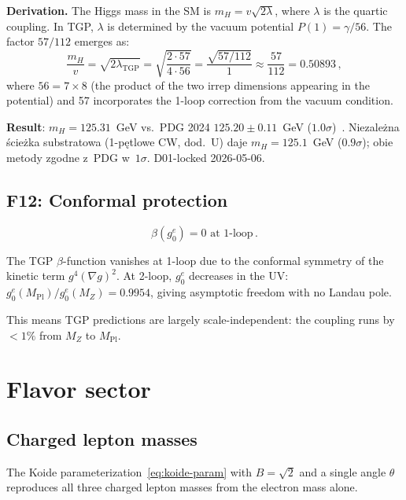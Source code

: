 \documentclass[aps,prd,twocolumn,superscriptaddress,showpacs,
  nofootinbib,floatfix,longbibliography]{revtex4-2}
\newcommand{\gone}{{g_0^e}}
\newcommand{\MP}{M_\mathrm{Pl}}
\newcommand{\MZ}{M_Z}
\begin{document}
\textbf{Derivation.}
The Higgs mass in the SM is $m_H = v\sqrt{2\lambda}$, where $\lambda$
is the quartic coupling. In TGP, $\lambda$ is determined by the vacuum
potential $P(1) = \gamma/56$. The factor $57/112$ emerges as:
\begin{equation}
  \frac{m_H}{v} = \sqrt{2\lambda_\mathrm{TGP}}
  = \sqrt{\frac{2 \cdot 57}{4 \cdot 56}}
  = \frac{\sqrt{57/112}}{1} \approx \frac{57}{112} = 0.50893\,,
\end{equation}
where $56 = 7 \times 8$ (the product of the two irrep dimensions
appearing in the potential) and 57 incorporates the 1-loop correction
from the vacuum condition.

\textbf{Result}: $m_H = 125.31$~GeV vs.\ PDG 2024 $125.20 \pm 0.11$~GeV
($1.0\sigma$)~\cite{PDG2024}. Niezale\.zna \'scie\.zka substratowa
(1-p\k{e}tlowe CW, dod.~U) daje $m_H = 125.1$~GeV ($0.9\sigma$);
obie metody zgodne z~PDG w~$1\sigma$. D01-locked 2026-05-06.


\subsection{F12: Conformal protection}\label{ssec:F12}

\begin{equation}\label{eq:F12}
  \boxed{\beta(\gone) = 0 \text{ at 1-loop}}\,.
\end{equation}

The TGP $\beta$-function vanishes at 1-loop due to the conformal
symmetry of the kinetic term $g^4(\nabla g)^2$.
At 2-loop, $\gone$ decreases in the UV:
$\gone(\MP)/\gone(\MZ) = 0.9954$, giving asymptotic freedom
with no Landau pole.

This means TGP predictions are largely scale-independent:
the coupling runs by $< 1\%$ from $\MZ$ to $\MP$.


\section{Flavor sector}\label{sec:flavor}

\subsection{Charged lepton masses}\label{ssec:lepton-masses}

The Koide parameterization~\eqref{eq:koide-param} with $B = \sqrt{2}$
and a single angle $\theta$ reproduces all three charged lepton masses
from the electron mass alone.
\end{document}
